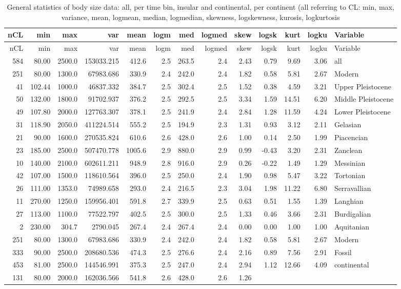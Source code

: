 \documentclass[]{article}
\begin{document}
\begin{longtable}[]{@{}rrrrrrrrrrrrl@{}}
\caption{General statistics of body size data: all, per time bin,
insular and continental, per continent (all referring to CL: min, max,
variance, mean, logmean, median, logmedian, skewness, logskewness,
kurosis, logkurtosis}\tabularnewline
\toprule
nCL & min & max & var & mean & logm & med & logmed & skew & logsk & kurt
& logku & Variable\tabularnewline
\midrule
\endfirsthead
\toprule
nCL & min & max & var & mean & logm & med & logmed & skew & logsk & kurt
& logku & Variable\tabularnewline
\midrule
\endhead
584 & 80.00 & 2500.0 & 153033.215 & 412.6 & 2.5 & 263.5 & 2.4 & 2.43 &
0.79 & 9.69 & 3.06 & all\tabularnewline
251 & 80.00 & 1300.0 & 67983.686 & 330.9 & 2.4 & 242.0 & 2.4 & 1.82 &
0.58 & 5.81 & 2.67 & Modern\tabularnewline
41 & 102.44 & 1000.0 & 46837.332 & 384.7 & 2.5 & 302.4 & 2.5 & 1.52 &
0.38 & 4.59 & 3.21 & Upper Pleistocene\tabularnewline
50 & 132.00 & 1800.0 & 91702.937 & 376.2 & 2.5 & 292.5 & 2.5 & 3.34 &
1.59 & 14.51 & 6.20 & Middle Pleistocene\tabularnewline
49 & 107.80 & 2000.0 & 127763.307 & 378.1 & 2.5 & 241.9 & 2.4 & 2.84 &
1.28 & 11.59 & 4.24 & Lower Pleistocene\tabularnewline
31 & 118.90 & 2050.0 & 411224.514 & 555.2 & 2.5 & 194.9 & 2.3 & 1.31 &
0.93 & 3.12 & 2.11 & Gelasian\tabularnewline
21 & 90.00 & 1600.0 & 270535.824 & 610.6 & 2.6 & 428.0 & 2.6 & 1.00 &
0.14 & 2.50 & 1.99 & Piacencian\tabularnewline
23 & 185.00 & 2500.0 & 507470.778 & 1005.6 & 2.9 & 880.0 & 2.9 & 0.99 &
-0.43 & 3.20 & 2.31 & Zanclean\tabularnewline
10 & 140.00 & 2100.0 & 602611.211 & 948.9 & 2.8 & 916.0 & 2.9 & 0.26 &
-0.22 & 1.49 & 1.29 & Messinian\tabularnewline
42 & 107.00 & 1500.0 & 118610.564 & 396.0 & 2.5 & 250.0 & 2.4 & 1.90 &
0.98 & 5.47 & 3.22 & Tortonian\tabularnewline
26 & 111.00 & 1353.0 & 74989.658 & 293.0 & 2.4 & 216.5 & 2.3 & 3.04 &
1.98 & 11.22 & 6.80 & Serravallian\tabularnewline
11 & 270.00 & 1250.0 & 159956.401 & 591.8 & 2.7 & 339.9 & 2.5 & 0.63 &
0.51 & 1.55 & 1.39 & Langhian\tabularnewline
27 & 113.00 & 1100.0 & 77522.797 & 402.5 & 2.5 & 300.0 & 2.5 & 1.33 &
0.46 & 3.66 & 2.31 & Burdigalian\tabularnewline
2 & 230.00 & 304.7 & 2790.045 & 267.4 & 2.4 & 267.4 & 2.4 & 0.00 & 0.00
& 1.00 & 1.00 & Aquitanian\tabularnewline
251 & 80.00 & 1300.0 & 67983.686 & 330.9 & 2.4 & 242.0 & 2.4 & 1.82 &
0.58 & 5.81 & 2.67 & Modern\tabularnewline
333 & 90.00 & 2500.0 & 208680.536 & 474.3 & 2.5 & 276.6 & 2.4 & 2.16 &
0.89 & 7.56 & 2.91 & Fossil\tabularnewline
453 & 81.00 & 2500.0 & 144546.991 & 375.3 & 2.5 & 247.0 & 2.4 & 2.94 &
1.12 & 12.66 & 4.09 & continental\tabularnewline
131 & 80.00 & 2000.0 & 162036.566 & 541.8 & 2.6 & 428.0 & 2.6 & 1.26 &

\end{longtable}
\end{document}

